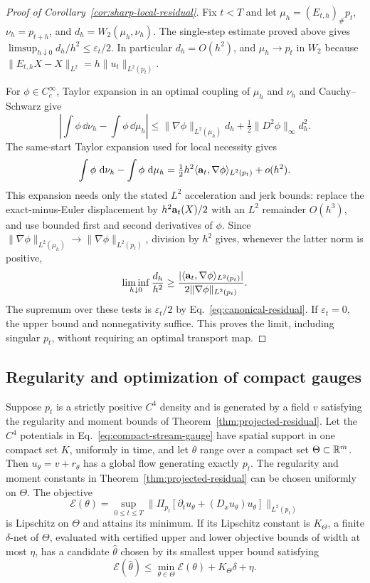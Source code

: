 \begin{proof}[Proof of Corollary~\ref{cor:sharp-local-residual}]
Fix $t<T$ and let $\mu_h=(E_{t,h})_\#p_t$, $\nu_h=p_{t+h}$, and
$d_h=W_2(\mu_h,\nu_h)$.  The single-step estimate proved above gives
$\limsup_{h\downarrow0}d_h/h^2\le\varepsilon_t/2$.
In particular $d_h=O(h^2)$, and $\mu_h\to p_t$ in $W_2$ because
$\|E_{t,h}X-X\|_{L^2}=h\|u_t\|_{L^2(p_t)}$.

For $\phi\in C_c^\infty$, Taylor expansion in an optimal coupling
of $\mu_h$ and $\nu_h$ and Cauchy--Schwarz give
\[
 \left|\int\phi\,\dd\nu_h-\int\phi\,\dd\mu_h\right|
 \le\|\nabla\phi\|_{L^2(\mu_h)}d_h
       +\tfrac12\|D^2\phi\|_\infty d_h^2.
\]
The same-start Taylor expansion used for local necessity gives
\[
 \int\phi\,\,\mathrm d\nu_h-\int\phi\,\,\mathrm d\mu_h
 =\tfrac12h^2\langle\mathbf a_t,\nabla\phi\rangle_{L^2(p_t)}+o(h^2).
\]
This expansion needs only the stated $L^2$ acceleration and jerk bounds:
replace the exact-minus-Euler displacement by $h^2\mathbf a_t(X)/2$
with an $L^2$ remainder $O(h^3)$, and use bounded first and second
derivatives of $\phi$.
Since $\|\nabla\phi\|_{L^2(\mu_h)}\to
\|\nabla\phi\|_{L^2(p_t)}$, division by $h^2$ gives, whenever the
latter norm is positive,
\[
 \liminf_{h\downarrow0}\frac{d_h}{h^2}
 \ge\frac{|\langle\mathbf a_t,\nabla\phi\rangle_{L^2(p_t)}|}
            {2\|\nabla\phi\|_{L^2(p_t)}}.
\]
The supremum over these tests is $\varepsilon_t/2$ by
Eq.~\eqref{eq:canonical-residual}.  If $\varepsilon_t=0$, the upper
bound and nonnegativity suffice.  This proves the limit, including
singular $p_t$, without requiring an optimal transport map.
\end{proof}

\subsection{Regularity and optimization of compact gauges}

\begin{proposition}
\label{prop:compact-gauge-search}
Suppose $p_t$ is a strictly positive $C^4$ density and is generated by a
field $v$ satisfying the regularity and moment bounds of
Theorem~\ref{thm:projected-residual}.  Let the $C^4$ potentials in
Eq.~\eqref{eq:compact-stream-gauge} have spatial support in one compact set
$K$, uniformly in time, and let $\theta$ range over a compact set
$\Theta\subset\mathbb R^m$.  Then $u_\theta=v+r_\theta$ has a global flow
generating exactly $p_t$.  The regularity and moment constants in
Theorem~\ref{thm:projected-residual} can be chosen uniformly on $\Theta$.
The objective
\begin{equation}
 \mathcal E(\theta)=\sup_{0\le t\le T}
    \|\Pi_{p_t}[\partial_tu_\theta+(D_xu_\theta)u_\theta]\|_{L^2(p_t)}
 \label{eq:gauge-objective}
\end{equation}
is Lipschitz on $\Theta$ and attains its minimum.
If its Lipschitz constant is $K_\Theta$, a finite $\delta$-net of
$\Theta$, evaluated with certified upper and lower objective bounds of
width at most $\eta$, has a candidate $\widehat\theta$ chosen by its
smallest upper bound satisfying
\[
 \mathcal E(\widehat\theta)
 \le\min_{\theta\in\Theta}\mathcal E(\theta)+K_\Theta\delta+\eta.
\]
\end{proposition}

